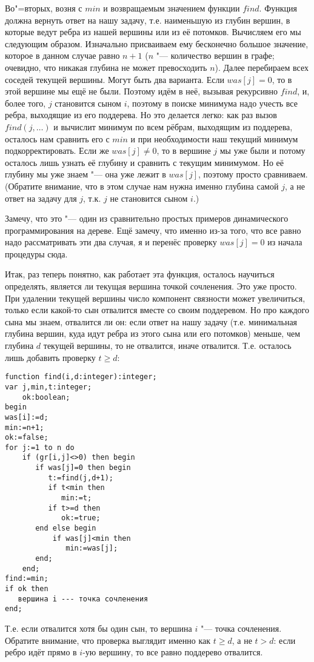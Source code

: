 Во"=вторых, возня с $min$ и возвращаемым значением функции $find$. Функция должна вернуть ответ на нашу задачу,
т.е. наименьшую из глубин вершин, в которые ведут ребра из нашей вершины или из её потомков. Вычисляем его мы следующим
образом. Изначально присваиваем ему бесконечно большое значение, которое в данном случае равно $n+1$ ($n$ "---
количество вершин в графе; очевидно, что никакая глубина не может превосходить $n$). Далее перебираем всех соседей
текущей вершины. Могут быть два варианта. Если $was[j]=0$, то в этой вершине мы ещё не были. Поэтому идём в неё,
вызывая рекурсивно $find$, и, более того, $j$ становится сыном $i$, поэтому в поиске минимума надо учесть все
ребра, выходящие из его поддерева. Но это делается легко: как раз вызов $find(j,\dots)$ и вычислит минимум по всем
рёбрам, выходящим из поддерева, осталось нам сравнить его с $min$ и при необходимости наш текущий минимум подкорректировать.
Если же $was[j]\neq 0$, то в вершине $j$ мы уже были и потому осталось лишь узнать её глубину и сравнить с текущим
минимумом. Но её глубину мы уже знаем "--- она уже лежит в $was[j]$, поэтому просто сравниваем. (Обратите внимание,
что в этом случае нам нужна именно глубина самой $j$, а не ответ на задачу для $j$, т.к. $j$ не становится сыном $i$.) 

Замечу, что это "--- один из сравнительно простых примеров динамического программирования на дереве. Ещё замечу,
что именно из-за того, что все равно надо рассматривать эти два случая, я и перенёс проверку $was[j]=0$ из начала процедуры
сюда.

Итак, раз теперь понятно, как работает эта функция, осталось научиться определять, является ли текущая вершина точкой 
сочленения. Это уже просто. При удалении текущей вершины число компонент связности может увеличиться, только
если какой-то сын отвалится вместе со своим поддеревом. Но про каждого сына мы знаем, отвалится ли он:
если ответ на нашу задачу (т.е. минимальная глубина вершин, куда идут ребра из этого сына или его потомков) меньше,
чем глубина $d$ текущей вершины, то не отвалится, иначе отвалится. Т.е. осталось лишь добавить проверку $t\geq d$:

\begin{codesample}\begin{verbatim}
function find(i,d:integer):integer;
var j,min,t:integer;
    ok:boolean;
begin
was[i]:=d;
min:=n+1;
ok:=false;
for j:=1 to n do
    if (gr[i,j]<>0) then begin
       if was[j]=0 then begin
          t:=find(j,d+1);
          if t<min then
             min:=t;
          if t>=d then
             ok:=true;
       end else begin
           if was[j]<min then
              min:=was[j];
       end;
    end;
find:=min;
if ok then
   вершина i --- точка сочленения
end;
\end{verbatim}
\end{codesample}
Т.е. если отвалится хотя бы один сын, то вершина $i$ "--- точка сочленения. Обратите внимание, что проверка выглядит
именно как $t\geq d$, а не $t>d$: если ребро идёт прямо в $i$-ую вершину, то все равно поддерево отвалится.

